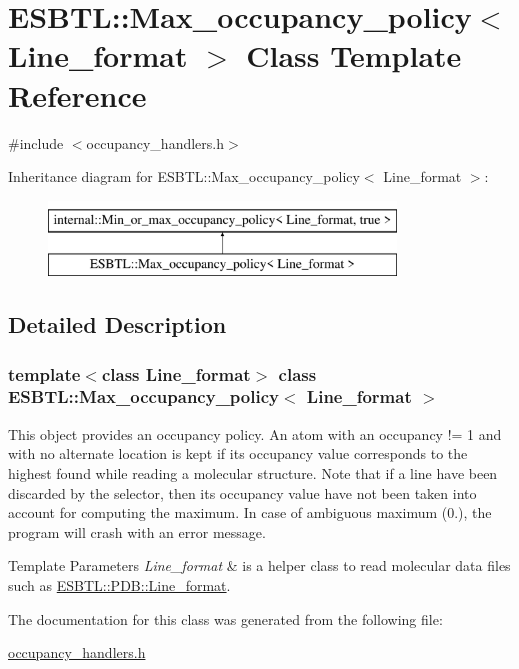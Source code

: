 \hypertarget{classESBTL_1_1Max__occupancy__policy}{}\section{E\+S\+B\+TL\+:\+:Max\+\_\+occupancy\+\_\+policy$<$ Line\+\_\+format $>$ Class Template Reference}
\label{classESBTL_1_1Max__occupancy__policy}


{\ttfamily \#include $<$occupancy\+\_\+handlers.\+h$>$}

Inheritance diagram for E\+S\+B\+TL\+:\+:Max\+\_\+occupancy\+\_\+policy$<$ Line\+\_\+format $>$\+:\begin{figure}[H]
\begin{center}
\leavevmode
\includegraphics[height=2.000000cm]{classESBTL_1_1Max__occupancy__policy}
\end{center}
\end{figure}


\subsection{Detailed Description}
\subsubsection*{template$<$class Line\+\_\+format$>$\newline
class E\+S\+B\+T\+L\+::\+Max\+\_\+occupancy\+\_\+policy$<$ Line\+\_\+format $>$}

This object provides an occupancy policy. An atom with an occupancy != 1 and with no alternate location is kept if its occupancy value corresponds to the highest found while reading a molecular structure. Note that if a line have been discarded by the selector, then its occupancy value have not been taken into account for computing the maximum. In case of ambiguous maximum (0.), the program will crash with an error message. 
\begin{DoxyTemplParams}{Template Parameters}
{\em Line\+\_\+format} & is a helper class to read molecular data files such as \hyperlink{classESBTL_1_1PDB_1_1Line__format}{E\+S\+B\+T\+L\+::\+P\+D\+B\+::\+Line\+\_\+format}. \\
\hline
\end{DoxyTemplParams}


The documentation for this class was generated from the following file\+:\begin{DoxyCompactItemize}
\item 
\hyperlink{occupancy__handlers_8h}{occupancy\+\_\+handlers.\+h}\end{DoxyCompactItemize}
